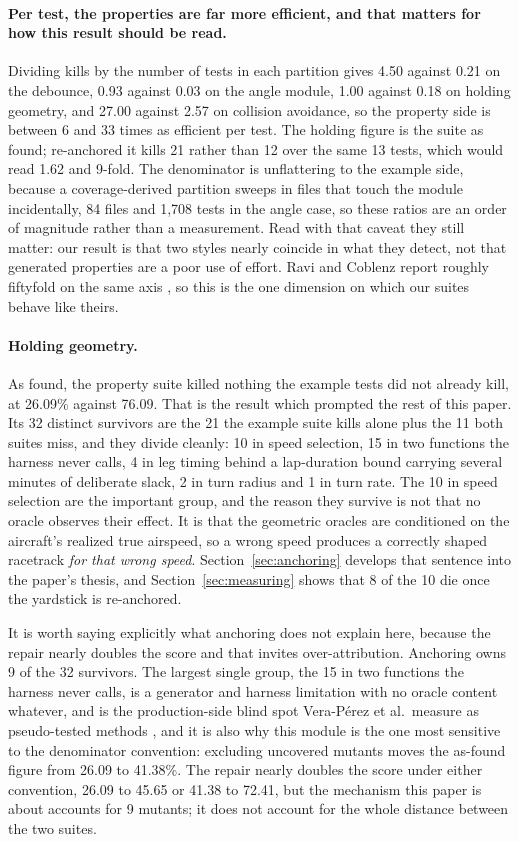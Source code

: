 \documentclass[12pt]{article}
\begin{document}
\paragraph{Per test, the properties are far more efficient, and that matters for
how this result should be read.} Dividing kills by the number of tests in each
partition gives 4.50 against 0.21 on the debounce, 0.93 against 0.03 on the angle
module, 1.00 against 0.18 on holding geometry, and 27.00 against 2.57 on collision
avoidance, so the property side is between 6 and 33 times as efficient per test.
The holding figure is the suite as found; re-anchored it kills 21 rather than 12
over the same 13 tests, which would read 1.62 and 9-fold.
The denominator is unflattering to the example side, because a coverage-derived
partition sweeps in files that touch the module incidentally, 84 files and 1{,}708
tests in the angle case, so these ratios are an order of magnitude rather than a
measurement. Read with that caveat they still matter: our result is that two
styles nearly coincide in what they detect, not that generated properties are a
poor use of effort. Ravi and Coblenz report roughly fiftyfold on the same axis
\cite{ravi2025}, so this is the one dimension on which our suites behave like
theirs.

\paragraph{Holding geometry.} As found, the property suite killed nothing the
example tests did not already kill, at 26.09\% against 76.09. That is the
result which prompted the rest of this paper. Its 32 distinct survivors are the
21 the example suite kills alone plus the 11 both suites miss, and they divide
cleanly: 10 in speed selection, 15 in two functions the harness never calls, 4 in
leg timing behind a lap-duration bound carrying several minutes of deliberate
slack, 2 in turn radius and 1 in turn rate. The 10 in speed selection are the
important group, and the reason they survive is not that no oracle observes their
effect. It is that the geometric oracles are conditioned on the aircraft's
realized true airspeed, so a wrong speed produces a correctly shaped racetrack
\emph{for that wrong speed}. Section~\ref{sec:anchoring} develops that sentence
into the paper's thesis, and Section~\ref{sec:measuring} shows that 8 of the
10 die once the yardstick is re-anchored.

It is worth saying explicitly what anchoring does not explain here, because the
repair nearly doubles the score and that invites over-attribution. Anchoring owns
9 of the 32 survivors. The largest single group, the 15 in two functions the
harness never calls, is a generator and harness limitation with no oracle content
whatever, and is the production-side blind spot Vera-P\'erez et al.\ measure as
pseudo-tested methods \cite{veraperez2018}, and it is also why this module is the one most sensitive to the
denominator convention: excluding uncovered mutants moves the as-found figure from
26.09 to 41.38\%. The repair nearly doubles the score under either
convention, 26.09 to 45.65 or 41.38 to 72.41, but the mechanism this paper is about accounts for 9 mutants; it does not account for the whole distance between the two suites.
\end{document}
